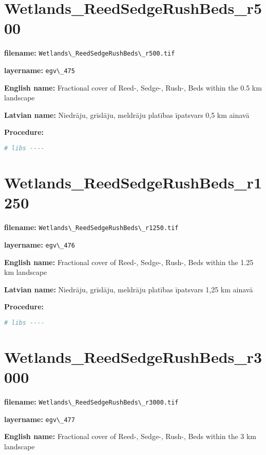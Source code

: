 \documentclass[
]{book}
\newcommand{\passthrough}[1]{#1}
\begin{document}
\section{Wetlands\_ReedSedgeRushBeds\_r500}\label{ch06.475}

\textbf{filename:} \passthrough{\lstinline!Wetlands\_ReedSedgeRushBeds\_r500.tif!}

\textbf{layername:} \passthrough{\lstinline!egv\_475!}

\textbf{English name:} Fractional cover of Reed-, Sedge-, Rush-, Beds within the 0.5 km landscape

\textbf{Latvian name:} Niedrāju, grīslāju, meldrāju platības īpatsvars 0,5 km ainavā

\textbf{Procedure:}

\begin{lstlisting}[language=R]
# libs ----
\end{lstlisting}

\section{Wetlands\_ReedSedgeRushBeds\_r1250}\label{ch06.476}

\textbf{filename:} \passthrough{\lstinline!Wetlands\_ReedSedgeRushBeds\_r1250.tif!}

\textbf{layername:} \passthrough{\lstinline!egv\_476!}

\textbf{English name:} Fractional cover of Reed-, Sedge-, Rush-, Beds within the 1.25 km landscape

\textbf{Latvian name:} Niedrāju, grīslāju, meldrāju platības īpatsvars 1,25 km ainavā

\textbf{Procedure:}

\begin{lstlisting}[language=R]
# libs ----
\end{lstlisting}

\section{Wetlands\_ReedSedgeRushBeds\_r3000}\label{ch06.477}

\textbf{filename:} \passthrough{\lstinline!Wetlands\_ReedSedgeRushBeds\_r3000.tif!}

\textbf{layername:} \passthrough{\lstinline!egv\_477!}

\textbf{English name:} Fractional cover of Reed-, Sedge-, Rush-, Beds within the 3 km landscape
\end{document}

